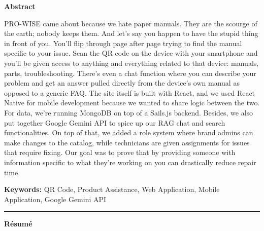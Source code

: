 \documentclass[12pt,a4paper]{report}
\begin{document}
\newpage
\thispagestyle{empty}

\begin{center}
{\Large \textbf{Abstract}}
\end{center}

\begingroup
\linespread{1.1}\selectfont
\small

PRO-WISE came about because we hate paper manuals. They are the scourge of the earth; nobody keeps them. And let's say you happen to have the stupid thing in front of you. You'll flip through page after page trying to find the manual specific to your issue.
Scan the QR code on the device with your smartphone and you'll be given access to anything and everything related to that device: manuals, parts, troubleshooting. There's even a chat function where you can describe your problem and get an answer pulled directly from the device's own manual as opposed to a generic FAQ.
The site itself is built with React, and we used React Native for mobile development because we wanted to share logic between the two. For data, we're running MongoDB on top of a Sails.js backend. Besides, we also put together Google Gemini API to spice up our RAG chat and search functionalities. On top of that, we added a role system where brand admins can make changes to the catalog, while technicians are given assignments for issues that require fixing.
Our goal was to prove that by providing someone with information specific to what they're working on you can drastically reduce repair time.

\vspace{0.15cm}
\textbf{Keywords:} QR Code, Product Assistance, Web Application, Mobile Application, Google Gemini API
\endgroup

\vspace{0.3cm}
\hrule
\vspace{0.3cm}

\begin{center}
{\Large \textbf{Résumé}}
\end{center}

\begingroup
\linespread{1.1}\selectfont
\small
\end{document}
